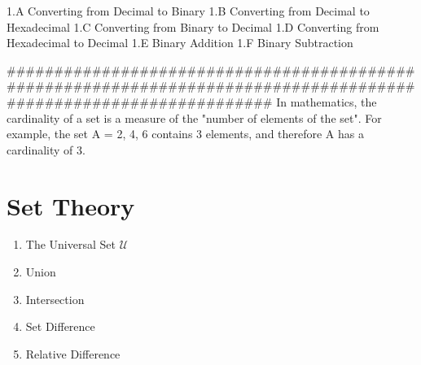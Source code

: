 
1.A  Converting from Decimal to Binary
1.B  Converting from Decimal to Hexadecimal
1.C  Converting from Binary to Decimal
1.D  Converting from Hexadecimal to Decimal
1.E  Binary Addition
1.F  Binary Subtraction





##################################################################################################################
In mathematics, the cardinality of a set is a measure of the "number of elements of the set". For example, the set A = {2, 4, 6} contains 3 elements, and therefore A has a cardinality of 3.

\section{Set Theory}
\begin{enumerate}
\item The Universal Set $\mathcal{U}$
\item Union
\item Intersection
\item Set Difference
\item Relative Difference
\end{enumerate}

